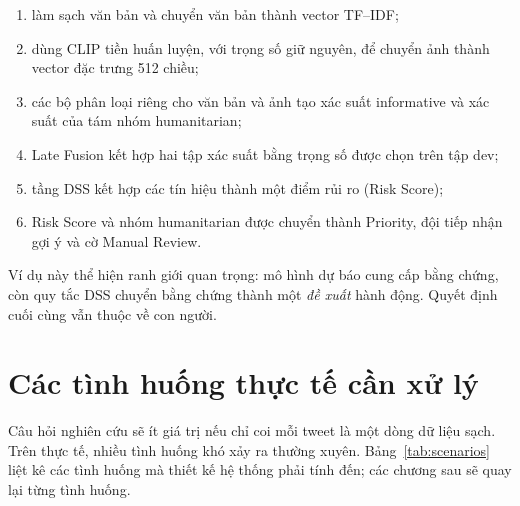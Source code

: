 \begin{enumerate}[leftmargin=*]
  \item làm sạch văn bản và chuyển văn bản thành vector TF--IDF;
  \item dùng CLIP tiền huấn luyện, với trọng số giữ nguyên, để chuyển ảnh thành
        vector đặc trưng 512 chiều;
  \item các bộ phân loại riêng cho văn bản và ảnh tạo xác suất informative và
        xác suất của tám nhóm humanitarian;
  \item Late Fusion kết hợp hai tập xác suất bằng trọng số được chọn trên tập
        dev;
  \item tầng DSS kết hợp các tín hiệu thành một điểm rủi ro (Risk Score);
  \item Risk Score và nhóm humanitarian được chuyển thành Priority, đội tiếp
        nhận gợi ý và cờ Manual Review.
\end{enumerate}

Ví dụ này thể hiện ranh giới quan trọng: mô hình dự báo cung cấp bằng chứng, còn
quy tắc DSS chuyển bằng chứng thành một \emph{đề xuất} hành động. Quyết định cuối
cùng vẫn thuộc về con người.

\section{Các tình huống thực tế cần xử lý}
\label{sec:scenarios}

Câu hỏi nghiên cứu sẽ ít giá trị nếu chỉ coi mỗi tweet là một dòng dữ liệu sạch.
Trên thực tế, nhiều tình huống khó xảy ra thường xuyên. Bảng~\ref{tab:scenarios}
liệt kê các tình huống mà thiết kế hệ thống phải tính đến; các chương sau sẽ
quay lại từng tình huống.

